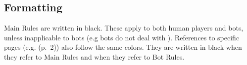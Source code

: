 \documentclass[10pt]{article}
\begin{document}
\subsection*{Formatting}

Main Rules are written in black. These apply to both human players and bots,
unless inapplicable to bots (e.g bots do not deal with \ducats).
References to specific pages (e.g. \dprime(p.~2)\dprime) also follow the same colors.
They are written in black when they refer to Main Rules and 
when they refer to Bot Rules.


\end{document}
